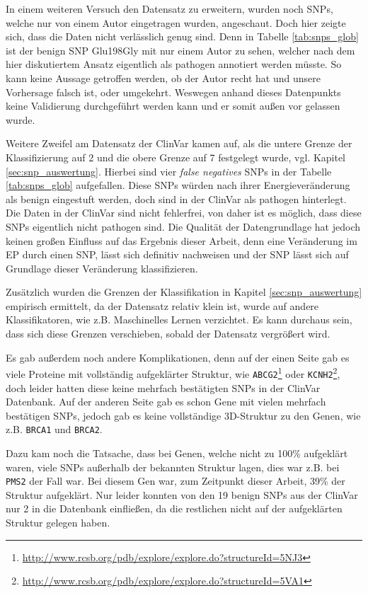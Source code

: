 In einem weiteren Versuch den Datensatz zu erweitern, wurden noch \ac{SNP}s, welche nur von einem Autor eingetragen wurden, angeschaut. Doch hier zeigte sich, dass die Daten nicht verlässlich genug sind. Denn in Tabelle \ref{tab:snps_glob} ist der benign \ac{SNP} Glu198Gly mit nur einem Autor zu sehen, welcher nach dem hier diskutiertem Ansatz eigentlich als pathogen annotiert werden müsste. So kann keine Aussage getroffen werden, ob der Autor recht hat und unsere Vorhersage falsch ist, oder umgekehrt. Weswegen anhand dieses Datenpunkts keine Validierung durchgeführt werden kann und er somit außen vor gelassen wurde.

Weitere Zweifel am Datensatz der ClinVar kamen auf, als die untere Grenze der Klassifizierung auf 2 und die obere Grenze auf 7 festgelegt wurde, vgl. Kapitel \ref{sec:snp_auswertung}. Hierbei sind vier \emph{false negatives} \ac{SNP}s in der Tabelle \ref{tab:snps_glob} aufgefallen. Diese \ac{SNP}s würden nach ihrer Energieveränderung als benign eingestuft werden, doch sind in der ClinVar als pathogen hinterlegt. Die Daten in der ClinVar sind nicht fehlerfrei, von daher ist es möglich, dass diese \ac{SNP}s eigentlich nicht pathogen sind. Die Qualität der Datengrundlage hat jedoch keinen großen Einfluss auf das Ergebnis dieser Arbeit, denn eine Veränderung im \ac{EP} durch einen \ac{SNP}, lässt sich definitiv nachweisen und der \ac{SNP} lässt sich auf Grundlage dieser Veränderung klassifizieren.

Zusätzlich wurden die Grenzen der Klassifikation in Kapitel \ref{sec:snp_auswertung} empirisch ermittelt, da der Datensatz relativ klein ist, wurde auf andere Klassifikatoren, wie z.B. Maschinelles Lernen verzichtet. Es kann durchaus sein, dass sich diese Grenzen verschieben, sobald der Datensatz vergrößert wird.

Es gab außerdem noch andere Komplikationen, denn auf der einen Seite gab es viele Proteine mit vollständig aufgeklärter Struktur, wie \texttt{ABCG2}\footnote{\url{http://www.rcsb.org/pdb/explore/explore.do?structureId=5NJ3}} oder \texttt{KCNH2}\footnote{\url{http://www.rcsb.org/pdb/explore/explore.do?structureId=5VA1}}, doch leider hatten diese keine mehrfach bestätigten \ac{SNP}s in der ClinVar Datenbank. Auf der anderen Seite gab es schon Gene mit vielen mehrfach bestätigen \ac{SNP}s, jedoch gab es keine vollständige 3D-Struktur zu den Genen, wie z.B. \texttt{BRCA1} und \texttt{BRCA2}.

Dazu kam noch die Tatsache, dass bei Genen, welche nicht zu 100\% aufgeklärt waren, viele \ac{SNP}s außerhalb der bekannten Struktur lagen, dies war z.B. bei \texttt{PMS2} der Fall war. Bei diesem Gen war, zum Zeitpunkt dieser Arbeit, 39\% der Struktur aufgeklärt. Nur leider konnten von den 19 benign \ac{SNP}s aus der ClinVar nur 2 in die Datenbank einfließen, da die restlichen nicht auf der aufgeklärten Struktur gelegen haben.

